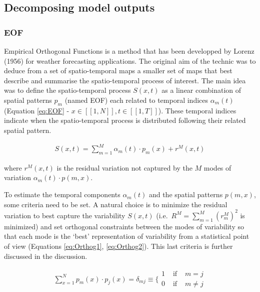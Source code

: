 \documentclass[
  man]{apa6}
\begin{document}
\hypertarget{decomposing-model-outputs}{%
\subsection{Decomposing model outputs}\label{decomposing-model-outputs}}

\hypertarget{eof}{%
\subsubsection{EOF}\label{eof}}

Empirical Orthogonal Functions is a method that has been developped by Lorenz (1956) for weather forecasting applications. The original aim of the technic was to deduce from a set of spatio-temporal maps a smaller set of maps that best describe and summarise the spatio-temporal process of interest. The main idea was to define the spatio-temporal process \(S(x,t)\) as a linear combination of spatial patterns \(p_m\) (named EOF) each related to temporal indices \(\alpha_m(t)\) (Equation \ref{eq:EOF} - \(x\in[\![1,N]\!],t\in[\![1,T]\!]\)). These temporal indices indicate when the spatio-temporal process is distributed following their related spatial pattern.

\begin{align} \label{eq:EOF}
S(x,t)=\sum_{m=1}^M \alpha_m(t) \cdot p_m(x) + r^M(x,t)
\end{align}

where \(r^M(x,t)\) is the residual variation not captured by the \(M\) modes of variation \(\alpha_m(t) \cdot p(m,x)\).

To estimate the temporal components \(\alpha_m(t)\) and the spatial patterns \(p(m,x)\), some criteria need to be set. A natural choice is to minimize the residual variation to best capture the variability \(S(x,t)\) (i.e.~\(R^M=\sum^M_{m=1}(r^M_m)^2\) is minimized) and set orthogonal constraints between the modes of variability so that each mode is the `best' representation of variability from a statistical point of view (Equations \ref{eq:Orthog1}, \ref{eq:Orthog2}). This last criteria is further discussed in the discussion.

\begin{align}
\label{eq:Orthog1}
\sum^N_{x=1} p_m(x) \cdot p_j(x) = \delta_{mj} \equiv \Bigg \{ \begin{array}{lll}1 & \text { if } & m=j \\ 0 & \text { if } & m \neq j\end{array}
\end{align}
\end{document}
